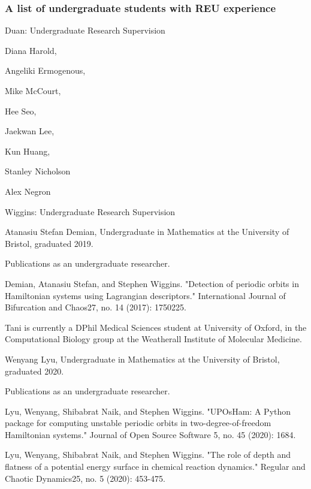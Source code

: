 \documentclass[11pt]{article}
\begin{document}
\subsubsection{A list of undergraduate students with REU experience}

Duan:  Undergraduate Research Supervision

Diana Harold, 

Angeliki Ermogenous, 

Mike McCourt, 

Hee Seo,

Jaekwan Lee,  

Kun Huang,

Stanley Nicholson

Alex Negron




Wiggins: Undergraduate Research Supervision

 

 

Atanasiu Stefan Demian, Undergraduate in Mathematics at the University of Bristol, graduated 2019.

 

Publications as an undergraduate researcher.

 

Demian, Atanasiu Stefan, and Stephen Wiggins. "Detection of periodic orbits in Hamiltonian systems using Lagrangian descriptors." International Journal of Bifurcation and Chaos27, no. 14 (2017): 1750225.

 

Tani is currently a DPhil Medical Sciences student at University of Oxford, in the Computational Biology group at the Weatherall Institute of Molecular Medicine.

 

Wenyang Lyu, Undergraduate in Mathematics at the University of Bristol, graduated 2020.

 

Publications as an undergraduate researcher.

 

Lyu, Wenyang, Shibabrat Naik, and Stephen Wiggins. "UPOsHam: A Python package for computing unstable periodic orbits in two-degree-of-freedom Hamiltonian systems." Journal of Open Source Software 5, no. 45 (2020): 1684.

 

Lyu, Wenyang, Shibabrat Naik, and Stephen Wiggins. "The role of depth and flatness of a potential energy surface in chemical reaction dynamics." Regular and Chaotic Dynamics25, no. 5 (2020): 453-475.
\end{document}
